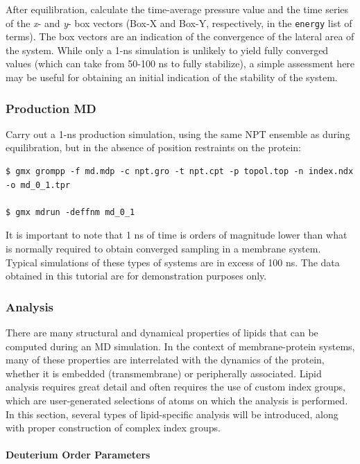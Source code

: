 \documentclass[9pt,tutorial,pubversion]{livecoms}
\begin{document}
After equilibration, calculate the time-average pressure value and the time series of the {\em x}- and {\em y}- box vectors (Box-X and Box-Y, respectively, in the \texttt{energy} list of terms). The box vectors are an indication of the convergence of the lateral area of the system. While only a 1-ns simulation is unlikely to yield fully converged values (which can take from 50-100 ns to fully stabilize), a simple assessment here may be useful for obtaining an initial indication of the stability of the system.

\subsubsection{Production MD} \label{kalp_md}

Carry out a 1-ns production simulation, using the same NPT ensemble as during equilibration, but in the absence of position restraints on the protein:

\begin{lstlisting}
$ gmx grompp -f md.mdp -c npt.gro -t npt.cpt -p topol.top -n index.ndx -o md_0_1.tpr

$ gmx mdrun -deffnm md_0_1
\end{lstlisting}
%
It is important to note that 1 ns of time is orders of magnitude lower than what is normally required to obtain converged sampling in a membrane system. Typical simulations of these types of systems are in excess of 100 ns. The data obtained in this tutorial are for demonstration purposes only.

\subsubsection{Analysis} \label{kalp_ana}

There are many structural and dynamical properties of lipids that can be computed during an MD simulation. In the context of membrane-protein systems, many of these properties are interrelated with the dynamics of the protein, whether it is embedded (transmembrane) or peripherally associated. Lipid analysis requires great detail and often requires the use of custom index groups, which are user-generated selections of atoms on which the analysis is performed. In this section, several types of lipid-specific analysis will be introduced, along with proper construction of complex index groups.

\paragraph{Deuterium Order Parameters} \label{kalp_ana_scd}
\end{document}

